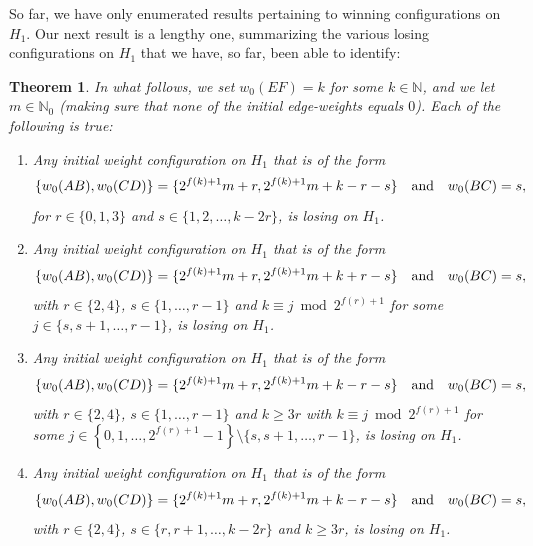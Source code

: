 \documentclass[11pt,reqno]{amsart}
\newtheorem{theorem}{Theorem}[section]
\theoremstyle{definition}
\theoremstyle{definition}
\begin{document}
So far, we have only enumerated results pertaining to winning configurations on $H_{1}$. Our next result is a lengthy one, summarizing the various losing configurations on $H_{1}$ that we have, so far, been able to identify:
\begin{theorem}\label{thm:H_{1}_losing}
In what follows, we set $w_{0}(EF)=k$ for some $k \in \mathbb{N}$, and we let $m \in \mathbb{N}_{0}$ (making sure that none of the initial edge-weights equals $0$). Each of the following is true:
\begin{enumerate}%
\item \label{B1} Any initial weight configuration on $H_{1}$ that is of the form
\begin{equation}
\{w_{0}(AB),w_{0}(CD)\}=\{2^{f(k)+1}m+r,2^{f(k)+1}m+k-r-s\} \quad \text{and} \quad w_{0}(BC)=s,\label{eq:H_{1}_losing_0,1,3}
\end{equation}
for $r \in \{0,1,3\}$ and $s \in \{1,2,\ldots,k-2r\}$, is losing on $H_{1}$. 
\item \label{B2} Any initial weight configuration on $H_{1}$ that is of the form
\begin{equation}
\{w_{0}(AB),w_{0}(CD)\}=\{2^{f(k)+1}m+r,2^{f(k)+1}m+k+r-s\} \quad \text{and} \quad w_{0}(BC)=s,\label{eq:H_{1}_losing_2,4_case_1}
\end{equation}
with $r \in \{2,4\}$, $s \in \{1,\ldots,r-1\}$ and $k \equiv j \bmod 2^{f(r)+1}$ for some $j \in \{s,s+1,\ldots,r-1\}$, is losing on $H_{1}$.
\item \label{B3} \sloppy Any initial weight configuration on $H_{1}$ that is of the form
\begin{equation}
\{w_{0}(AB),w_{0}(CD)\}=\{2^{f(k)+1}m+r,2^{f(k)+1}m+k-r-s\} \quad \text{and} \quad w_{0}(BC)=s,\label{eq:H_{1}_losing_2,4_case_2}
\end{equation}
with $r \in \{2,4\}$, $s \in \{1,\ldots,r-1\}$ and $k \geqslant 3r$ with $k \equiv j \bmod 2^{f(r)+1}$ for some $j \in \left\{0,1,\ldots,2^{f(r)+1}-1\right\}\setminus\{s,s+1,\ldots,r-1\}$, is losing on $H_{1}$.
\item \label{B4} Any initial weight configuration on $H_{1}$ that is of the form
\begin{equation}
\{w_{0}(AB),w_{0}(CD)\}=\{2^{f(k)+1}m+r,2^{f(k)+1}m+k-r-s\} \quad \text{and} \quad w_{0}(BC)=s,\label{eq:H_{1}_losing_2,4_case_3}
\end{equation}
with $r \in \{2,4\}$, $s \in \{r,r+1,\ldots,k-2r\}$ and $k\geqslant 3r$, is losing on $H_{1}$.
\end{enumerate}
\end{theorem}
\end{document}
